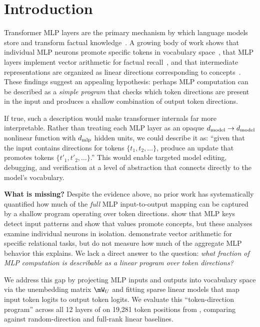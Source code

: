 \section{Introduction}
\label{sec:intro}

Transformer MLP layers are the primary mechanism by which language models store and transform factual knowledge~\citep{geva2021transformer,meng2022locating,dai2022knowledge}.
A growing body of work shows that individual MLP neurons promote specific tokens in vocabulary space~\citep{geva2022transformer}, that MLP layers implement vector arithmetic for factual recall~\citep{merullo2023language}, and that intermediate representations are organized as linear directions corresponding to concepts~\citep{park2024linear}.
These findings suggest an appealing hypothesis: perhaps MLP computation can be described as a \emph{simple program} that checks which token directions are present in the input and produces a shallow combination of output token directions.

If true, such a description would make transformer internals far more interpretable.
Rather than treating each MLP layer as an opaque $d_{\text{model}} \to d_{\text{model}}$ nonlinear function with $d_{\text{mlp}}$ hidden units, we could describe it as: ``given that the input contains directions for tokens $\{t_1, t_2, \ldots\}$, produce an update that promotes tokens $\{t'_1, t'_2, \ldots\}$.''
This would enable targeted model editing, debugging, and verification at a level of abstraction that connects directly to the model's vocabulary.

{\bf What is missing?}
Despite the evidence above, no prior work has systematically quantified how much of the \emph{full} MLP input-to-output mapping can be captured by a shallow program operating over token directions.
\citet{geva2021transformer} show that MLP keys detect input patterns and \citet{geva2022transformer} show that values promote concepts, but these analyses examine individual neurons in isolation.
\citet{merullo2023language} demonstrate vector arithmetic for specific relational tasks, but do not measure how much of the aggregate MLP behavior this explains.
We lack a direct answer to the question: \emph{what fraction of MLP computation is describable as a linear program over token directions?}

We address this gap by projecting MLP inputs and outputs into vocabulary space via the unembedding matrix $\Wu$ and fitting sparse linear models that map input token logits to output token logits.
We evaluate this ``token-direction program'' across all 12 layers of \gpttwo on 19,281 token positions from \wikitext, comparing against random-direction and full-rank linear baselines.

